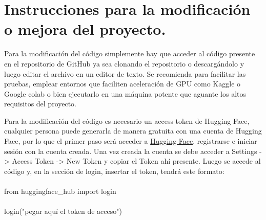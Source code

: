 \section{Instrucciones para la modificación o mejora del proyecto.}

Para la modificación del código simplemente hay que acceder al código presente en el repositorio de GitHub ya sea clonando el repositorio o descargándolo y luego editar el archivo en un editor de texto. Se recomienda para facilitar las pruebas, emplear entornos que faciliten aceleración de GPU como Kaggle o Google colab o bien ejecutarlo en una máquina potente que aguante los altos requisitos del proyecto.

Para la modificación del código es necesario un access token de Hugging Face, cualquier persona puede generarla de manera gratuita con una cuenta de Hugging Face, por lo que el primer paso será acceder a \href{https://huggingface.co/}{Hugging Face}. registrarse e iniciar sesión con la cuenta creada.
Una vez creada la cuenta se debe acceder a Settings -> Access Token -> New Token y copiar el Token ahí presente.
Luego se accede al código y, en la sección de login, insertar el token, tendrá este formato:
\\
\\
from huggingface\_hub import login \\ \\
login("pegar aquí el token de acceso")